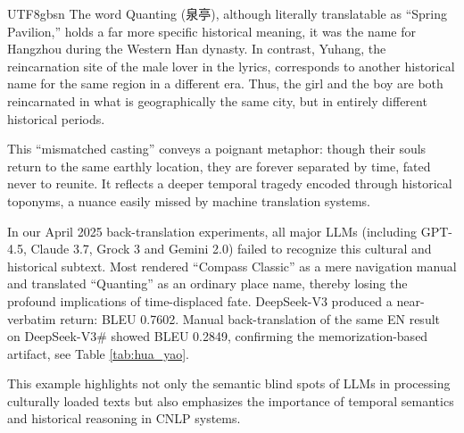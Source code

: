 \documentclass[conference]{IEEEtran}
\begin{document}
\begin{CJK}{UTF8}{gbsn}
The word Quanting (泉亭), although literally translatable as ``Spring Pavilion,'' holds a far more specific historical meaning, it was the name for Hangzhou during the Western Han dynasty. In contrast, Yuhang, the reincarnation site of the male lover in the lyrics, corresponds to another historical name for the same region in a different era. Thus, the girl and the boy are both reincarnated in what is geographically the same city, but in entirely different historical periods.

This ``mismatched casting'' conveys a poignant metaphor: though their souls return to the same earthly location, they are forever separated by time, fated never to reunite. It reflects a deeper temporal tragedy encoded through historical toponyms, a nuance easily missed by machine translation systems.

In our April 2025 back-translation experiments, all major LLMs (including GPT-4.5, Claude 3.7, Grock 3 and Gemini 2.0) failed to recognize this cultural and historical subtext. Most rendered ``Compass Classic'' as a mere navigation manual and translated ``Quanting'' as an ordinary place name, thereby losing the profound implications of time-displaced fate. DeepSeek-V3 produced a near-verbatim return: BLEU 0.7602. Manual back-translation of the same EN result on DeepSeek-V3\# showed BLEU 0.2849, confirming the memorization-based artifact, see Table \ref{tab:hua_yao}.

This example highlights not only the semantic blind spots of LLMs in processing culturally loaded texts but also emphasizes the importance of temporal semantics and historical reasoning in CNLP systems.


\end{CJK}
\end{document}
